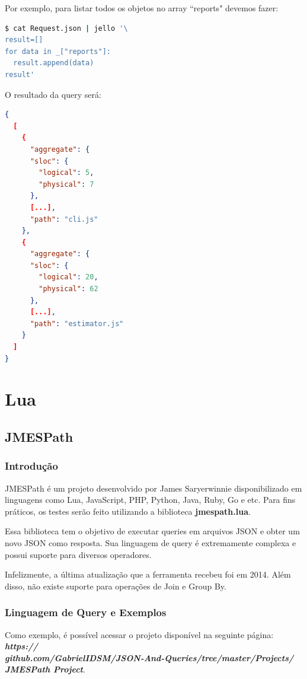 \documentclass[a4paper, 12pt] {article}
\begin{document}
				Por exemplo, para listar todos os objetos no array “reports" devemos fazer:
\begin{lstlisting}[language=bash]
$ cat Request.json | jello '\
result=[]
for data in _["reports"]:
  result.append(data)
result'
\end{lstlisting}

				\newpage O resultado da query será:
\begin{lstlisting}[language=json,firstnumber=1]
{
  [
    {
      "aggregate": {
      "sloc": {
        "logical": 5,
        "physical": 7
      },
      [...],
      "path": "cli.js"
    },
    {
      "aggregate": {
      "sloc": {
        "logical": 20,
        "physical": 62
      },
      [...],
      "path": "estimator.js"
    }
  ]
}
\end{lstlisting}
	\newpage \section{Lua}
		\subsection{JMESPath}
			\subsubsection{Introdução}
				JMESPath é um projeto desenvolvido por James Saryerwinnie disponibilizado em linguagens como Lua, JavaScript, PHP, Python, Java, Ruby, Go e etc. Para fins práticos, os testes serão feito utilizando a biblioteca \textbf{jmespath.lua}.

				Essa biblioteca tem o objetivo de executar queries em arquivos JSON e obter um novo JSON como resposta. Sua linguagem de query é extremamente complexa e possui suporte para diversos operadores.

				Infelizmente, a última atualização que a ferramenta recebeu foi em 2014. Além disso, não existe suporte para operações de Join e Group By.
			\subsubsection{Linguagem de Query e Exemplos}
				Como exemplo, é possível acessar o projeto disponível na seguinte página: \textbf{\textit{https://\\github.com/GabrielIDSM/JSON-And-Queries/tree/master/Projects/\\JMESPath Project}}.
\end{document}
